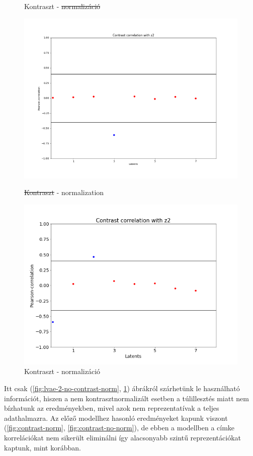 \documentclass[12pt, english]{article}
\begin{document}
\begin{figure}[H]
\begin{minipage}{0.5\linewidth}
    \caption{Kontraszt - \st{normalizáció}} 
    \label{fig:lvae-2-contrast-no-norm}
  \end{minipage} 
  \begin{minipage}{0.5\linewidth}
    \centering
    \includegraphics[width=.72\linewidth]{lvae2/18_DenseLadderVAE_contrastNorm-contrast-to-z2-corr.png} 
    \caption{\st{Kontraszt} - normalization} 
    \label{fig:lvae-2-no-contrast-norm}
  \end{minipage}%
  \begin{minipage}{0.5\linewidth}
    \centering
    \includegraphics[width=.72\linewidth]{lvae2/19_DenseLadderVAE_contrastNorm_contrast-contrast-to-z2-corr.png} 
    \caption{Kontraszt - normalizáció} 
    \label{fig:lave-2-contrast-norm}
  \end{minipage} 
\end{figure}

\vspace{4mm}

\par Itt csak (\ref{fig:lvae-2-no-contrast-norm}, \ref{fig:lave-2-contrast-norm}) ábrákról szárhetünk le használható információt, hiszen a nem kontrasztnormalizált esetben a túlillesztés miatt nem bízhatunk az eredményekben, mivel azok nem reprezentatívak a teljes adathalmazra. Az előző modellhez hasonló eredményeket kapunk viszont (\ref{fig:contrast-norm}, \ref{fig:contrast-no-norm}), de ebben a modellben a címke korrelációkat nem sikerült eliminálni így alacsonyabb szintű reprezentációkat kaptunk, mint korábban.
\end{document}
